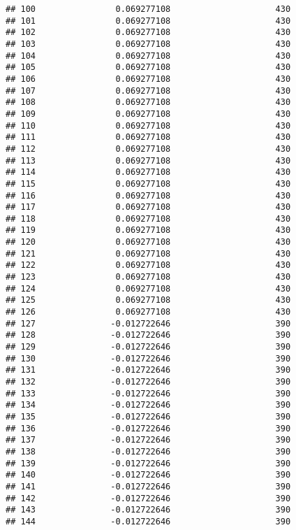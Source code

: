 \documentclass[]{article}
\begin{document}
\begin{verbatim}
## 100                0.069277108                     430
## 101                0.069277108                     430
## 102                0.069277108                     430
## 103                0.069277108                     430
## 104                0.069277108                     430
## 105                0.069277108                     430
## 106                0.069277108                     430
## 107                0.069277108                     430
## 108                0.069277108                     430
## 109                0.069277108                     430
## 110                0.069277108                     430
## 111                0.069277108                     430
## 112                0.069277108                     430
## 113                0.069277108                     430
## 114                0.069277108                     430
## 115                0.069277108                     430
## 116                0.069277108                     430
## 117                0.069277108                     430
## 118                0.069277108                     430
## 119                0.069277108                     430
## 120                0.069277108                     430
## 121                0.069277108                     430
## 122                0.069277108                     430
## 123                0.069277108                     430
## 124                0.069277108                     430
## 125                0.069277108                     430
## 126                0.069277108                     430
## 127               -0.012722646                     390
## 128               -0.012722646                     390
## 129               -0.012722646                     390
## 130               -0.012722646                     390
## 131               -0.012722646                     390
## 132               -0.012722646                     390
## 133               -0.012722646                     390
## 134               -0.012722646                     390
## 135               -0.012722646                     390
## 136               -0.012722646                     390
## 137               -0.012722646                     390
## 138               -0.012722646                     390
## 139               -0.012722646                     390
## 140               -0.012722646                     390
## 141               -0.012722646                     390
## 142               -0.012722646                     390
## 143               -0.012722646                     390
## 144               -0.012722646                     390

\end{verbatim}
\end{document}
